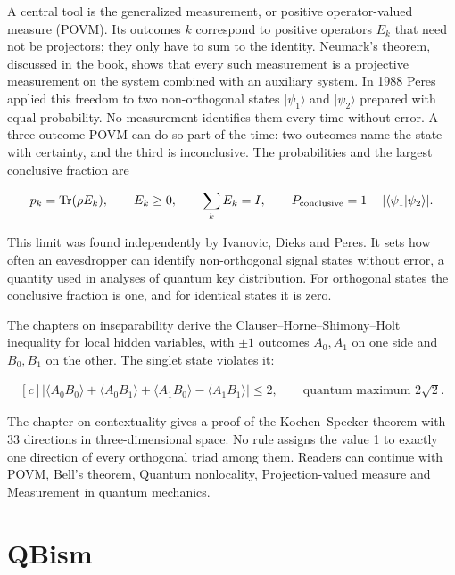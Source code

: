 \documentclass[11pt,oneside]{book}
\newenvironment{centeredalign}{\[\begin{gathered}[c]}{\end{gathered}\]}
\newcommand{\ket}[1]{\lvert #1\rangle}
\begin{document}
A central tool is the generalized measurement, or positive operator-valued measure (POVM). Its outcomes \(k\) correspond to positive operators \(E_k\) that need not be projectors; they only have to sum to the identity. Neumark's theorem, discussed in the book, shows that every such measurement is a projective measurement on the system combined with an auxiliary system. In 1988 Peres applied this freedom to two non-orthogonal states \(\ket{\psi_1}\) and \(\ket{\psi_2}\) prepared with equal probability. No measurement identifies them every time without error. A three-outcome POVM can do so part of the time: two outcomes name the state with certainty, and the third is inconclusive. The probabilities and the largest conclusive fraction are

\begin{centeredalign}
p_k=\operatorname{Tr}(\rho E_k),\qquad E_k\geq0,\qquad \sum_kE_k=I,\qquad
P_{\rm conclusive}=1-|\langle\psi_1|\psi_2\rangle| .
\end{centeredalign}

This limit was found independently by Ivanovic, Dieks and Peres. It sets how often an eavesdropper can identify non-orthogonal signal states without error, a quantity used in analyses of quantum key distribution. For orthogonal states the conclusive fraction is one, and for identical states it is zero.

The chapters on inseparability derive the Clauser--Horne--Shimony--Holt inequality for local hidden variables, with \(\pm1\) outcomes \(A_0,A_1\) on one side and \(B_0,B_1\) on the other. The singlet state violates it:

\begin{centeredalign}
|\langle A_0B_0\rangle+\langle A_0B_1\rangle+\langle A_1B_0\rangle-\langle A_1B_1\rangle|
\leq2,\qquad \text{quantum maximum } 2\sqrt2 .
\end{centeredalign}

The chapter on contextuality gives a proof of the Kochen--Specker theorem with 33 directions in three-dimensional space. No rule assigns the value 1 to exactly one direction of every orthogonal triad among them. Readers can continue with POVM, Bell's theorem, Quantum nonlocality, Projection-valued measure and Measurement in quantum mechanics.







\clearpage

\section{QBism}
\end{document}
